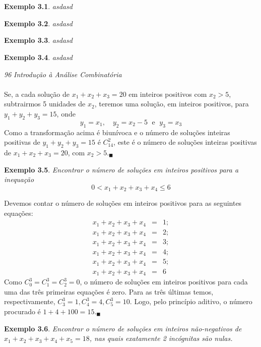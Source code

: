 \documentclass[a4paper,12pt]{book}
\newtheorem{exemplo}{Exemplo}[chapter]
\begin{document}
\setlength{\voffset}{-0.75in}
\chapter{}
\chapter{}
\chapter{}
\begin{exemplo}
asdasd
\end{exemplo}
\begin{exemplo}
asdasd
\end{exemplo}
\begin{exemplo}
asdasd
\end{exemplo}
\begin{exemplo}
asdasd
\end{exemplo}
\newpage
\thispagestyle{empty}
\hspace{-0.6cm}\textit{96}
\hfill
\textit{Introdução à Análise Combinatória}
\\\\
Se, a cada solução de $x_1+x_2+x_3=20$ em inteiros positivos com $x_2 > 5$, subtrairmos 5 unidades de $x_2$, teremos uma solução, em inteiros positivos, para $y_1+y_2+y_3=15$, onde
$$
y_1=x_1,\quad y_2=x_2-5 \; \mbox{ e }\; y_3=x_3
$$ 
Como a transformação acima é biunívoca e o número de soluções inteiras positivas de $y_1+y_2+y_3=15$ é $C_{14}^2$, este é o número de soluções inteiras positivas de  $x_1+x_2+x_3=20$, com $x_2>5. _\blacksquare$
\begin{exemplo}
Encontrar o número de soluções em inteiros positivos para a inequação
$$0<x_1+x_2+x_3+x_4 \leq 6$$
\end{exemplo}

Devemos contar o número de soluções em inteiros positivos para as seguintes equações:
\begin{eqnarray}
x_1+x_2+x_3+x_4&=&1;\nonumber \\
x_1+x_2+x_3+x_4&=&2;\nonumber \\
x_1+x_2+x_3+x_4&=&3;\nonumber \\
x_1+x_2+x_3+x_4&=&4;\nonumber \\
x_1+x_2+x_3+x_4&=&5;\nonumber \\
x_1+x_2+x_3+x_4&=&6 \nonumber
\end{eqnarray}
Como $C_0^3=C_1^3=C_2^3=0$, o número de soluções em inteiros positivos para cada uma das três primeiras equações é zero. Para as três últimas temos, respectivamente, $C_3^3=1, C_4^3=4, C_5^3=10.$ Logo, pelo princípio aditivo, o número procurado é $1+4+100=15._\blacksquare$
\begin{exemplo}
Encontrar o número de soluções em inteiros não-negativos de $x_1+x_2+x_3+x_4+x_5=18$, nas quais exatamente 2 incógnitas são nulas.
\end{exemplo}
\end{document}
